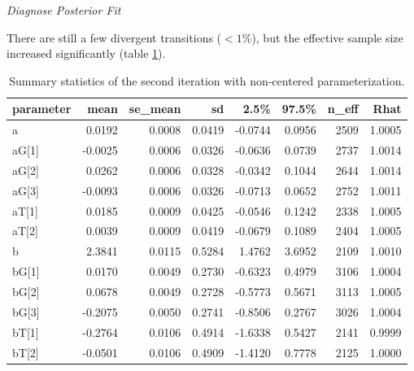 \documentclass[11pt, oneside, openany]{scrbook}
\newenvironment{Shaded}{\begin{snugshade}}{\end{snugshade}}
\newcommand{\CommentTok}[1]{\textcolor[rgb]{0.56,0.35,0.01}{\textit{#1}}}
\newcommand{\KeywordTok}[1]{\textcolor[rgb]{0.13,0.29,0.53}{\textbf{#1}}}
\newcommand{\NormalTok}[1]{#1}
\begin{document}

\emph{Diagnose Posterior Fit}


\begin{Shaded}
\end{Shaded}


There are still a few divergent transitions (\(<1\%\)), but the effective sample size increased significantly (table \ref{tab:ch042-Bleeding-Tuna}).

\begin{table}[!h]

\caption{\label{tab:ch042-Bleeding-Tuna}Summary statistics of the second iteration with non-centered parameterization.}
\centering
\begin{tabular}[t]{lrrrrrrr}
\toprule
parameter & mean & se\_mean & sd & 2.5\% & 97.5\% & n\_eff & Rhat\\
\midrule
a & 0.0192 & 0.0008 & 0.0419 & -0.0744 & 0.0956 & 2509 & 1.0005\\
aG[1] & -0.0025 & 0.0006 & 0.0326 & -0.0636 & 0.0739 & 2737 & 1.0014\\
aG[2] & 0.0262 & 0.0006 & 0.0328 & -0.0342 & 0.1044 & 2644 & 1.0014\\
aG[3] & -0.0093 & 0.0006 & 0.0326 & -0.0713 & 0.0652 & 2752 & 1.0011\\
aT[1] & 0.0185 & 0.0009 & 0.0425 & -0.0546 & 0.1242 & 2338 & 1.0005\\
\addlinespace
aT[2] & 0.0039 & 0.0009 & 0.0419 & -0.0679 & 0.1089 & 2404 & 1.0005\\
b & 2.3841 & 0.0115 & 0.5284 & 1.4762 & 3.6952 & 2109 & 1.0010\\
bG[1] & 0.0170 & 0.0049 & 0.2730 & -0.6323 & 0.4979 & 3106 & 1.0004\\
bG[2] & 0.0678 & 0.0049 & 0.2728 & -0.5773 & 0.5671 & 3113 & 1.0005\\
bG[3] & -0.2075 & 0.0050 & 0.2741 & -0.8506 & 0.2767 & 3026 & 1.0004\\
\addlinespace
bT[1] & -0.2764 & 0.0106 & 0.4914 & -1.6338 & 0.5427 & 2141 & 0.9999\\
bT[2] & -0.0501 & 0.0106 & 0.4909 & -1.4120 & 0.7778 & 2125 & 1.0000\\
\bottomrule
\end{tabular}
\end{table}
\end{document}
